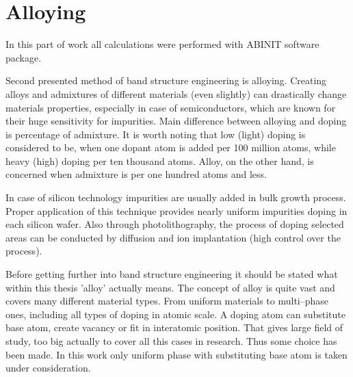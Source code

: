 \ornament

\section{Alloying}
\label{sect:alloy_theory}

In this part of work all calculations were performed with ABINIT software package.

Second presented method of band structure engineering is alloying.
Creating alloys and admixtures of different materials (even slightly) can drastically change materials properties, especially in case of semiconductors, which are known for their huge sensitivity for impurities.
Main difference between alloying and doping is percentage of admixture.
It is worth noting that low (light) doping is considered to be, when one dopant atom is added per 100 million atoms, while heavy (high) doping per ten thousand atoms.
Alloy, on the other hand, is concerned when admixture is per one hundred atoms and less.

In case of silicon technology impurities are usually added in bulk growth process.
Proper application of this technique provides nearly uniform impurities doping in each silicon wafer.
Also through photolithography, the process of doping selected areas can be conducted by diffusion and ion implantation (high control over the process).

Before getting further into band structure engineering it should be stated what within this thesis 'alloy' actually means.
The concept of alloy is quite vast and covers many different material types.
From uniform materials to multi--phase ones, including all types of doping in atomic scale.
A doping atom can substitute base atom, create vacancy or fit in interatomic position.
That gives large field of study, too big actually to cover all this cases in research.
Thus some choice has been made.
In this work only uniform phase with substituting base atom is taken under consideration.

